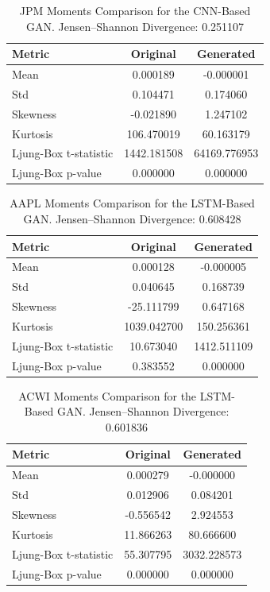 \documentclass{article}
\begin{document}
\begin{table}[h!]
\centering
\begin{tabular}{lcc}
\hline
\textbf{Metric} & \textbf{Original} & \textbf{Generated} \\
\hline
Mean     & 0.000189 & -0.000001 \\
Std      & 0.104471 & 0.174060 \\
Skewness & -0.021890 & 1.247102 \\
Kurtosis & 106.470019 & 60.163179 \\
Ljung-Box t-statistic & 1442.181508 & 64169.776953 \\
Ljung-Box p-value & 0.000000 & 0.000000 \\
\hline
\end{tabular}
\caption{JPM Moments Comparison for the CNN-Based GAN.
Jensen--Shannon Divergence: 0.251107}
\label{tab:jpm_cnn}
\end{table}

\begin{table}[h!]
\centering
\begin{tabular}{lcc}
\hline
\textbf{Metric} & \textbf{Original} & \textbf{Generated} \\
\hline
Mean     & 0.000128 & -0.000005 \\
Std      & 0.040645 & 0.168739 \\
Skewness & -25.111799 & 0.647168 \\
Kurtosis & 1039.042700 & 150.256361 \\
Ljung-Box t-statistic & 10.673040 & 1412.511109 \\
Ljung-Box p-value & 0.383552 & 0.000000 \\
\hline
\end{tabular}
\caption{AAPL Moments Comparison for the LSTM-Based GAN.
Jensen--Shannon Divergence: 0.608428}
\label{tab:aapl_attention}
\end{table}

\begin{table}[h!]
\centering
\begin{tabular}{lcc}
\hline
\textbf{Metric} & \textbf{Original} & \textbf{Generated} \\
\hline
Mean     & 0.000279 & -0.000000 \\
Std      & 0.012906 & 0.084201 \\
Skewness & -0.556542 & 2.924553 \\
Kurtosis & 11.866263 & 80.666600 \\
Ljung-Box t-statistic & 55.307795 & 3032.228573 \\
Ljung-Box p-value & 0.000000 & 0.000000 \\
\hline
\end{tabular}
\caption{ACWI Moments Comparison for the LSTM-Based GAN.
Jensen--Shannon Divergence: 0.601836}
\label{tab:acwi_lstm}
\end{table}
\end{document}
